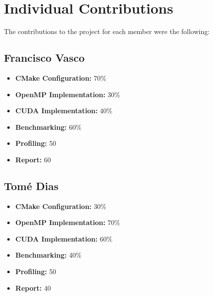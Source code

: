 \documentclass[sigconf]{acmart}
\begin{document}
    \section{Individual Contributions}
    The contributions to the project for each member were the following:

    \subsection{Francisco Vasco}
    \begin{itemize}
        \item \textbf{CMake Configuration:} 70\%
        \item \textbf{OpenMP Implementation:} 30\%
        \item \textbf{CUDA Implementation:} 40\%
        \item \textbf{Benchmarking:} 60\%
        \item \textbf{Profiling:} 50%
        \item \textbf{Report:} 60%
    \end{itemize}

    \subsection{Tomé Dias}
    \begin{itemize}
        \item \textbf{CMake Configuration:} 30\%
        \item \textbf{OpenMP Implementation:} 70\%
        \item \textbf{CUDA Implementation:} 60\%
        \item \textbf{Benchmarking:} 40\%
        \item \textbf{Profiling:} 50%
        \item \textbf{Report:} 40%
    \end{itemize}
\end{document}
